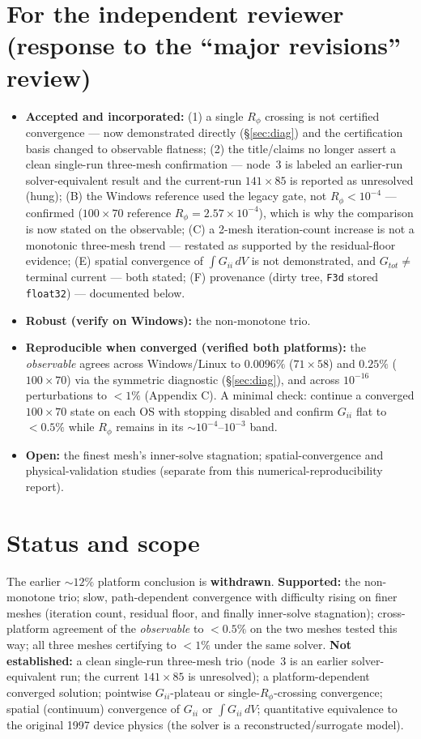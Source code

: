 \documentclass[11pt]{article}
\newcommand{\ten}[1]{\times 10^{#1}}
\begin{document}
\section{For the independent reviewer (response to the ``major revisions'' review)}
\begin{itemize}[nosep]
\item \textbf{Accepted and incorporated:} (1) a single $R_\phi$ crossing is not certified convergence --- now demonstrated directly (\S\ref{sec:diag}) and the certification basis changed to observable flatness; (2) the title/claims no longer assert a clean single-run three-mesh confirmation --- node~3 is labeled an earlier-run solver-equivalent result and the current-run $141\times85$ is reported as unresolved (hung); (B) the Windows reference used the legacy gate, not $R_\phi<10^{-4}$ --- confirmed ($100\times70$ reference $R_\phi=2.57\ten{-4}$), which is why the comparison is now stated on the observable; (C) a 2-mesh iteration-count increase is not a monotonic three-mesh trend --- restated as supported by the residual-floor evidence; (E) spatial convergence of $\int G_{ii}\,dV$ is not demonstrated, and $G_{tot}\ne$ terminal current --- both stated; (F) provenance (dirty tree, \texttt{F3d} stored \texttt{float32}) --- documented below.
\item \textbf{Robust (verify on Windows):} the non-monotone trio.
\item \textbf{Reproducible when converged (verified both platforms):} the \emph{observable} agrees across Windows/Linux to $0.0096\%$ ($71\times58$) and $0.25\%$ ($100\times70$) via the symmetric diagnostic (\S\ref{sec:diag}), and across $10^{-16}$ perturbations to $<\!1\%$ (Appendix C). A minimal check: continue a converged $100\times70$ state on each OS with stopping disabled and confirm $G_{ii}$ flat to $<\!0.5\%$ while $R_\phi$ remains in its $\sim\!10^{-4}$--$10^{-3}$ band.
\item \textbf{Open:} the finest mesh's inner-solve stagnation; spatial-convergence and physical-validation studies (separate from this numerical-reproducibility report).
\end{itemize}

\section{Status and scope}\label{sec:status}
The earlier $\sim\!12\%$ platform conclusion is \textbf{withdrawn}. \textbf{Supported:} the non-monotone trio; slow, path-dependent convergence with difficulty rising on finer meshes (iteration count, residual floor, and finally inner-solve stagnation); cross-platform agreement of the \emph{observable} to $<\!0.5\%$ on the two meshes tested this way; all three meshes certifying to $<\!1\%$ under the same solver. \textbf{Not established:} a clean single-run three-mesh trio (node~3 is an earlier solver-equivalent run; the current $141\times85$ is unresolved); a platform-dependent converged solution; pointwise $G_{ii}$-plateau or single-$R_\phi$-crossing convergence; spatial (continuum) convergence of $G_{ii}$ or $\int G_{ii}\,dV$; quantitative equivalence to the original 1997 device physics (the solver is a reconstructed/surrogate model).
\end{document}
